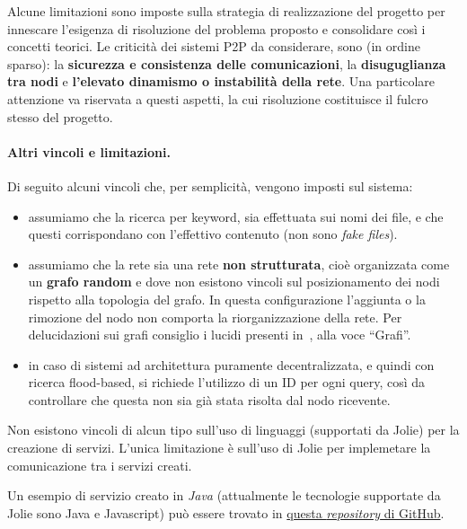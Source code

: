 Alcune limitazioni sono imposte sulla strategia di realizzazione del progetto
per innescare l'esigenza di risoluzione del problema proposto e consolidare così
i concetti teorici. Le criticità dei sistemi P2P da considerare, sono (in ordine
sparso): la \textbf{sicurezza e consistenza delle comunicazioni}, la
\textbf{disuguglianza tra nodi} e \textbf{l'elevato dinamismo o instabilità
 della rete}. Una particolare attenzione va riservata a questi aspetti, la cui
risoluzione costituisce il fulcro stesso del progetto.

\paragraph{Altri vincoli e limitazioni.} Di seguito alcuni vincoli che, per
semplicità, vengono imposti sul sistema:

\begin{itemize}

 \item assumiamo che la ricerca per keyword, sia effettuata sui
       nomi dei file, e che questi corrispondano con l'effettivo contenuto
       (non sono \textit{fake files}).

 \item assumiamo che la rete sia una rete \textbf{non strutturata}, cioè
       organizzata come un \textbf{grafo random} e dove non esistono vincoli sul
       posizionamento dei nodi rispetto alla topologia del grafo. In questa
       configurazione l'aggiunta o la rimozione del nodo non comporta la
       riorganizzazione della rete. Per delucidazioni sui grafi consiglio i lucidi presenti in~\cite{grafi}, alla voce ``Grafi''.

 \item in caso di sistemi ad architettura puramente decentralizzata, e quindi
       con ricerca flood-based, si richiede l'utilizzo di un  ID per ogni query, così
       da controllare che questa non sia già stata risolta dal nodo  ricevente.

\end{itemize}

Non esistono vincoli di alcun tipo sull'uso di linguaggi (supportati da Jolie)
per la creazione di servizi. L'unica limitazione è sull'uso di Jolie per
implemetare la comunicazione tra i servizi creati.

Un esempio di servizio creato in \textit{Java} (attualmente le tecnologie
supportate da Jolie sono Java e Javascript) può essere trovato in
\href{https://github.com/szingaro/jolie-file-worker}{questa \textit{repository}
 di GitHub}.

